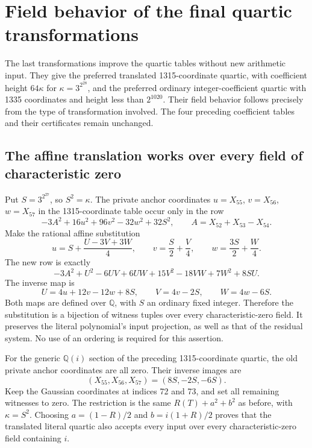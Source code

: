 \section{Field behavior of the final quartic transformations}
\label{sec:final-quartic-fields-v2}

The last transformations improve the quartic tables without
new arithmetic input.  They give the preferred translated
1315-coordinate quartic, with coefficient height
$64\kappa$ for $\kappa=3^{2^{28}}$, and the preferred ordinary
integer-coefficient quartic with 1335 coordinates and height
less than $2^{1020}$.  Their field behavior follows precisely
from the type of transformation involved.  The four preceding
coefficient tables and their certificates remain unchanged.

\subsection{The affine translation works over every field of characteristic zero}

Put $S=3^{2^{27}}$, so $S^2=\kappa$.  The private anchor
coordinates $u=X_{55}$, $v=X_{56}$, $w=X_{57}$ in the
1315-coordinate table occur only in the row
\[
              -3A^2+16u^2+96v^2-32w^2+32S^2,
                    \qquad A=X_{52}+X_{53}-X_{54}.
\]
Make the rational affine substitution
\begin{equation}\label{eq:final-anchor-affine-map-v2}
 u=S+\frac{U-3V+3W}{4},\qquad
 v=\frac S2+\frac V4,\qquad
 w=\frac{3S}{2}+\frac W4.
\end{equation}
The new row is exactly
\[
 -3A^2+U^2-6UV+6UW+15V^2-18VW+7W^2+8SU.
\]
The inverse map is
\[
       U=4u+12v-12w+8S,\qquad V=4v-2S,
                                      \qquad W=4w-6S.
\]
Both maps are defined over $\mathbb Q$, with $S$ an ordinary
fixed integer.  Therefore the substitution is a bijection of
witness tuples over every characteristic-zero field.  It
preserves the literal polynomial's input projection, as well
as that of the residual system.  No use of an ordering is
required for this assertion.

For the generic $\mathbb Q(i)$ section of the preceding
1315-coordinate quartic, the old private anchor coordinates
are all zero.  Their inverse images are
\[
                   (X_{55},X_{56},X_{57})=(8S,-2S,-6S).
\]
Keep the Gaussian coordinates at indices 72 and 73, and set
all remaining witnesses to zero.  The restriction is the
same $R(T)+a^2+b^2$ as before, with $\kappa=S^2$.
Choosing $a=(1-R)/2$ and $b=i(1+R)/2$ proves that the
translated literal quartic also accepts every input over
every characteristic-zero field containing $i$.

